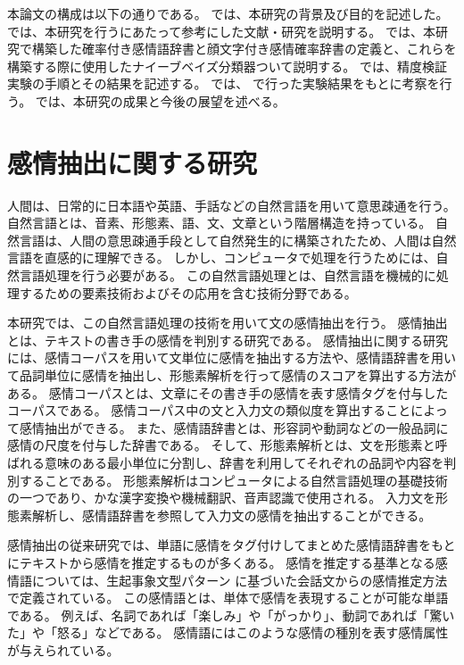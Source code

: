 \documentclass[11pt,a4j]{jsarticle}
\begin{document}
本論文の構成は以下の通りである。
 では、本研究の背景及び目的を記述した。 では、本研究を行うにあたって参考にした文献・研究を説明する。
 では、本研究で構築した確率付き感情語辞書と顔文字付き感情確率辞書の定義と、これらを構築する際に使用したナイーブベイズ分類器ついて説明する。
では、精度検証実験の手順とその結果を記述する。
では、 で行った実験結果をもとに考察を行う。
では、本研究の成果と今後の展望を述べる。

\section{感情抽出に関する研究}\label{sec:relatedworks}
人間は、日常的に日本語や英語、手話などの自然言語を用いて意思疎通を行う。
自然言語とは、音素、形態素、語、文、文章という階層構造を持っている。
自然言語は、人間の意思疎通手段として自然発生的に構築されたため、人間は自然言語を直感的に理解できる。
しかし、コンピュータで処理を行うためには、自然言語処理を行う必要がある。
この自然言語処理とは、自然言語を機械的に処理するための要素技術およびその応用を含む技術分野である。

本研究では、この自然言語処理の技術を用いて文の感情抽出を行う。
感情抽出とは、テキストの書き手の感情を判別する研究である。
感情抽出に関する研究には、感情コーパスを用いて文単位に感情を抽出する方法や、感情語辞書を用いて品詞単位に感情を抽出し、形態素解析を行って感情のスコアを算出する方法がある。
感情コーパスとは、文章にその書き手の感情を表す感情タグを付与したコーパスである。
感情コーパス中の文と入力文の類似度を算出することによって感情抽出ができる。
また、感情語辞書とは、形容詞や動詞などの一般品詞に感情の尺度を付与した辞書である。
そして、形態素解析とは、文を形態素と呼ばれる意味のある最小単位に分割し、辞書を利用してそれぞれの品詞や内容を判別することである。
形態素解析はコンピュータによる自然言語処理の基礎技術の一つであり、かな漢字変換や機械翻訳、音声認識で使用される。
入力文を形態素解析し、感情語辞書を参照して入力文の感情を抽出することができる。

感情抽出の従来研究では、単語に感情をタグ付けしてまとめた感情語辞書をもとにテキストから感情を推定するものが多くある。
感情を推定する基準となる感情語については、生起事象文型パターン  に基づいた会話文からの感情推定方法で定義されている。
この感情語とは、単体で感情を表現することが可能な単語である。
例えば、名詞であれば「楽しみ」や「がっかり」、動詞であれば「驚いた」や「怒る」などである。
感情語にはこのような感情の種別を表す感情属性が与えられている。
\end{document}
